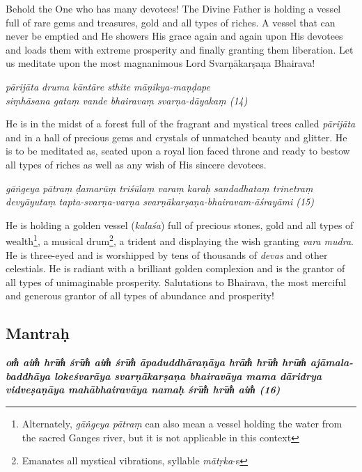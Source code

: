 \documentclass[12pt,oneside,a4paper]{article}
\newenvironment{shloka}[1]
  {\bigskip\center#1\varwidth{\linewidth}}
  {\endvarwidth\endcenter\bigskip}
\newcommand{\tl}[1]{\emph{#1}}
\begin{document}
Behold the One who has many devotees! The Divine Father is holding a vessel full
of rare gems and treasures, gold and all types of riches. A vessel that can
never be emptied and He showers His grace again and again upon His devotees and
loads them with extreme prosperity and finally granting them liberation. Let us
meditate upon the most magnanimous Lord Svarṇākarṣaṇa Bhairava!

\begin{shloka}\itshape
  pārijāta druma kāntāre sthite māṇikya-maṇḍape\\
  siṃhāsana gataṃ vande bhairavaṃ svarṇa-dāyakaṃ (14)
\end{shloka}

He is in the midst of a forest full of the fragrant and mystical trees called
\tl{pārijāta} and in a hall of precious gems and crystals of unmatched beauty
and glitter. He is to be meditated as, seated upon a royal lion faced throne
and ready to bestow all types of riches as well as any wish of His sincere
devotees.

\begin{shloka}\itshape
  gāṅgeya pātraṃ ḍamarūṃ triśūlaṃ varaṃ karaḥ sandadhataṃ trinetraṃ\\
  devyāyutaṃ tapta-svarṇa-varṇa svarṇākarṣaṇa-bhairavam-āśrayāmi (15)
\end{shloka}

He is holding a golden vessel (\tl{kalaśa}) full of precious stones, gold and
all types of wealth\footnote{Alternately, \tl{gāṅgeya pātraṃ} can also mean
a vessel holding the water from the sacred Ganges river, but it is not
applicable in this context}, a musical drum\footnote{Emanates all mystical
vibrations, syllable \tl{mātṛka}-s}, a trident and displaying the wish granting
\tl{vara mudra}. He is three-eyed and is worshipped by tens of thousands of
\tl{devas} and other celestials. He is radiant with a brilliant golden
complexion and is the grantor of all types of unimaginable prosperity.
Salutations to Bhairava, the most merciful and generous grantor of all types
of abundance and prosperity!

\subsection{Mantraḥ}

\begin{shloka}\itshape\bfseries
  om̐ aim̐ hrīm̐ śrīm̐ aim̐ śrīm̐ āpaduddhāraṇāya hrām̐ hrīm̐ hrūm̐ ajāmala-baddhāya
  lokeśvarāya svarṇākarṣaṇa bhairavāya mama dāridrya vidveṣaṇāya mahābhairavāya
  namaḥ śrīm̐ hrīm̐ aim̐ (16)
\end{shloka}
\end{document}
